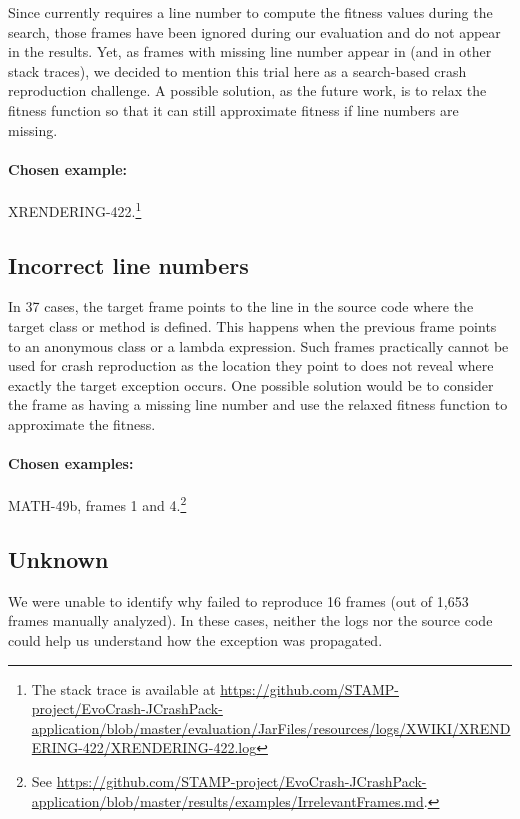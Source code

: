 Since \evocrash currently requires a line number to compute the fitness values during the search, those frames have been ignored during our evaluation and do not appear in the results.
Yet, as frames with missing line number appear in \crashpack (and in other stack traces), we decided to mention this trial here as a search-based crash reproduction challenge.
A possible solution, as the future work, is to relax the fitness function so that it can still approximate fitness if line numbers are missing.

\paragraph{Chosen example:} 
XRENDERING-422.\footnote{The stack trace is available at \url{https://github.com/STAMP-project/EvoCrash-JCrashPack-application/blob/master/evaluation/JarFiles/resources/logs/XWIKI/XRENDERING-422/XRENDERING-422.log}}


\subsection{Incorrect line numbers}

In 37 cases, the target frame points to the line in the source code where the target class or method is defined.
This happens when the previous frame points to an anonymous class or a lambda expression.
Such frames practically cannot be used for crash reproduction as the location they point to does not reveal where exactly the target exception occurs.
One possible solution would be to consider the frame as having a missing line number and use the relaxed fitness function to approximate the fitness. 

\paragraph{Chosen examples:} 
MATH-49b, frames 1 and 4.\footnote{See \url{https://github.com/STAMP-project/EvoCrash-JCrashPack-application/blob/master/results/examples/IrrelevantFrames.md}.}


\subsection{Unknown}

We were unable to identify why \evocrash failed to reproduce 16 frames (out of 1,653 frames manually analyzed). 
In these cases, neither the logs nor the source code could help us understand how the exception was propagated. 


